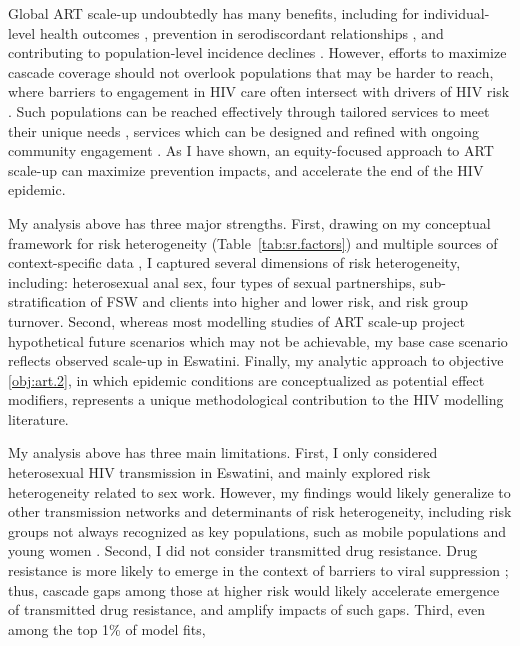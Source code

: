 Global ART scale-up undoubtedly has many benefits, including for
individual-level health outcomes \cite{Gabillard2013,Lundgren2015},
prevention in serodiscordant relationships \cite{Cohen2016},
and contributing to population-level incidence declines \cite{Havlir2020}.
However, efforts to maximize cascade coverage should not overlook
populations that may be harder to reach,
where barriers to engagement in HIV care often intersect with drivers of HIV risk
\cite{Wanyenze2016,Schwartz2017,Schmidt-Sane2022,Baral2019}.
Such populations can be reached effectively through
tailored services to meet their unique needs \cite{Ehrenkranz2019},
services which can be designed and refined with ongoing community engagement
\cite{Chikwari2018,Mlambo2019,Comins2022}.
As I have shown, an equity-focused approach to ART scale-up can maximize prevention impacts,
and accelerate the end of the HIV epidemic.
\par
My analysis above has three major strengths.
First, drawing on my conceptual framework for risk heterogeneity (Table~\ref{tab:sr.factors})
and multiple sources of context-specific data \cite{SDHS2006,SHIMS1,Justman2016,Baral2014,EswKP2014},
I captured several dimensions of risk heterogeneity, including:
heterosexual anal sex,
four types of sexual partnerships,
sub-stratification of FSW and clients into higher and lower risk,
and risk group turnover.
Second, whereas most modelling studies of ART scale-up
project hypothetical future scenarios which may not be achievable,
my base case scenario reflects observed scale-up in Eswatini.
Finally, my analytic approach to objective \ref{obj:art.2},
in which epidemic conditions are conceptualized as potential effect modifiers,
represents a unique methodological contribution to the HIV modelling literature.
\par
My analysis above has three main limitations.
First, I only considered heterosexual HIV transmission in Eswatini,
and mainly explored risk heterogeneity related to sex work.
However, my findings would likely generalize
to other transmission networks and determinants of risk heterogeneity,
including risk groups not always recognized as key populations,
such as mobile populations and young women \cite{Tanser2015,Cheuk2020}.
Second, I did not consider transmitted drug resistance.
Drug resistance is more likely to emerge
in the context of barriers to viral suppression \cite{Pham2014};
thus, cascade gaps among those at higher risk
would likely accelerate emergence of transmitted drug resistance, and amplify impacts of such gaps.
Third, even among the top 1\% of model fits,
